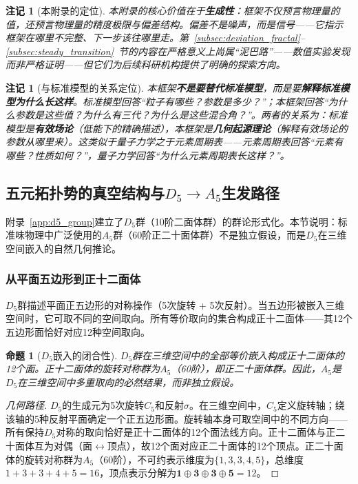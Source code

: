 \documentclass[12pt,a4paper,twocolumn]{article}
\newtheorem{proposition}[theorem]{命题}
\newtheorem{remark}[theorem]{注记}
\begin{document}
\begin{remark}[本附录的定位]
本附录的核心价值在于\textbf{生成性}：框架不仅预言物理量的值，还预言物理量的精度极限与偏差结构。偏差不是噪声，而是信号——它指示框架在哪里不完整、下一步该往哪里走。第~\ref{subsec:deviation_fractal}--\ref{subsec:steady_transition}~节的内容在严格意义上尚属``泥巴路''——数值实验发现而非严格证明——但它们为后续科研机构提供了明确的探索方向。
\end{remark}

\begin{remark}[与标准模型的关系定位]
\label{rmk:sm_relation}
本框架\textbf{不是要替代标准模型}，而是要\textbf{解释标准模型为什么长这样}。标准模型回答``粒子有哪些？参数是多少？''；本框架回答``为什么参数是这些值？为什么有三代？为什么是这些混合角？''。两者的关系为：标准模型是\textbf{有效场论}（低能下的精确描述），本框架是\textbf{几何起源理论}（解释有效场论的参数从哪里来）。这类似于量子力学之于元素周期表——元素周期表回答``元素有哪些？性质如何？''，量子力学回答``为什么元素周期表长这样？''。
\end{remark}

\subsection{五元拓扑势的真空结构与$D_5 \to A_5$生发路径}
\label{subsec:d5_a5_path}

附录~\ref{app:d5_group}建立了$D_5$群（10阶二面体群）的群论形式化。本节说明：标准味物理中广泛使用的$A_5$群（60阶正二十面体群）不是独立假设，而是$D_5$在三维空间嵌入的自然几何推论。

\subsubsection{从平面五边形到正十二面体}

$D_5$群描述平面正五边形的对称操作（5次旋转 + 5次反射）。当五边形被嵌入三维空间时，它可取不同的空间取向。所有等价取向的集合构成正十二面体——其12个五边形面恰好对应12种空间取向。

\begin{proposition}[$D_5$嵌入的闭合性]
\label{prop:d5_embed}
$D_5$群在三维空间中的全部等价嵌入构成正十二面体的12个面。正十二面体的旋转对称群为$A_5$（60阶），即正二十面体群。因此，$A_5$是$D_5$在三维空间中多重取向的必然结果，而非独立假设。
\end{proposition}

\begin{proof}[几何路径]
$D_5$的生成元为5次旋转$C_5$和反射$\sigma$。在三维空间中，$C_5$定义旋转轴；绕该轴的5种反射平面确定一个正五边形面。旋转轴本身可取空间中的不同方向——所有保持$D_5$对称的取向恰好是正十二面体的12个面法线方向。正十二面体与正二十面体互为对偶（面$\leftrightarrow$顶点），故12个面对应正二十面体的12个顶点。正二十面体的旋转对称群为$A_5$（60阶），不可约表示维度为$\{1,3,3,4,5\}$，总维度$1+3+3+4+5=16$，顶点表示分解为$\mathbf{1}\oplus\mathbf{3}\oplus\mathbf{3}\oplus\mathbf{5}=12$。
\end{proof}
\end{document}
